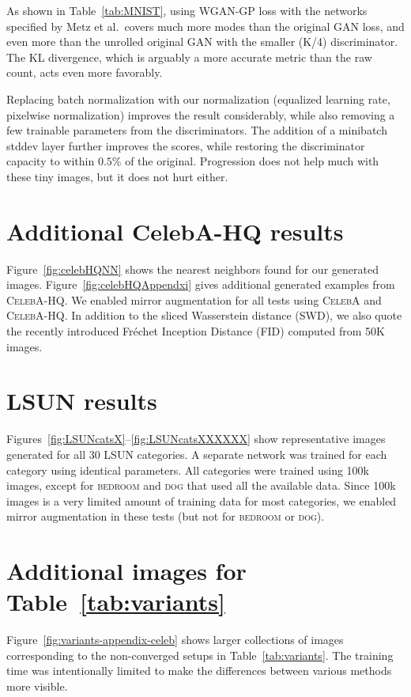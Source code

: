 \documentclass{article}
\begin{document}
As shown in Table~\ref{tab:MNIST}, using WGAN-GP loss with the networks specified by Metz et al.~covers much more modes than the original GAN loss, and even more than the unrolled original GAN with the smaller (K/4) discriminator. The KL divergence, which is arguably a more accurate metric than the raw count, acts even more favorably. 

Replacing batch normalization with our normalization (equalized learning rate, pixelwise normalization) improves the result considerably, while also removing a few trainable parameters from the discriminators. The addition of a minibatch stddev layer further improves the scores, while restoring the discriminator capacity to within $0.5\%$ of the original. Progression does not help much with these tiny images, but it does not hurt either. 

\newpage
\section{Additional CelebA-HQ results}
\label{app:CelebHQ}
Figure~\ref{fig:celebHQNN} shows the nearest neighbors found for our generated images. %
Figure~\ref{fig:celebHQAppendxi} gives additional generated examples from \textsc{CelebA-HQ}.
We enabled mirror augmentation for all tests using \textsc{CelebA} and \textsc{CelebA-HQ}.
In addition to the sliced Wasserstein distance (SWD), we also quote the recently introduced Fr\'echet Inception Distance (FID) \citep{Heusel2017} computed from 50K images.
\figcelebHQNN
\figcelebHQAppendix

\section{LSUN results}
\label{app:LSUN}
Figures~\ref{fig:LSUNcatsX}--\ref{fig:LSUNcatsXXXXXX} show representative images generated for all 30 \textsc{LSUN} categories. A separate network was trained for each category using identical parameters. All categories were trained using 100k images, except for \textsc{bedroom} and \textsc{dog} that used all the available data. Since 100k images is a very limited amount of training data for most categories, we enabled mirror augmentation in these tests (but not for \textsc{bedroom} or \textsc{dog}).
\figLSUNcatsX
\figLSUNcatsXX
\figLSUNcatsXXX
\figLSUNcatsXXXX
\figLSUNcatsXXXXX
\figLSUNcatsXXXXXX

\section{Additional images for Table~\ref{tab:variants}}
\label{app:variants}
Figure~\ref{fig:variants-appendix-celeb} shows larger collections of images corresponding to the non-converged setups in Table~\ref{tab:variants}. The training time was intentionally limited to make the differences between various methods more visible.
\figvariantsAppendixCeleb
\end{document}
